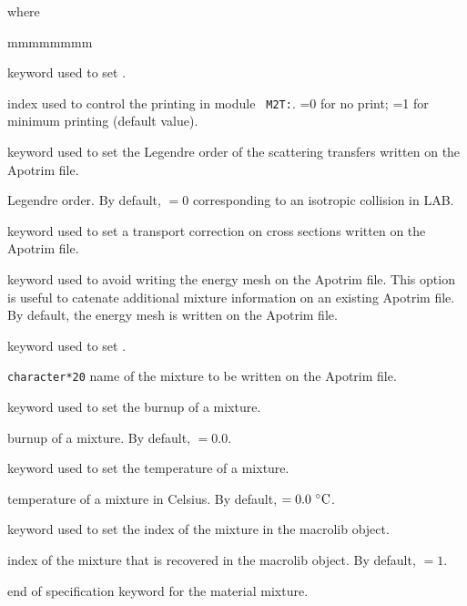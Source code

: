 \noindent where
\begin{ListeDeDescription}{mmmmmmmm}

\item[\moc{EDIT}] keyword used to set .

\item[\dusa{iprint}] index used to control the printing in module {\tt
M2T:}. =0 for no print; =1 for minimum printing (default value).

\item[\moc{PN}] keyword used to set the Legendre order of the scattering transfers written on the Apotrim file.

\item[\dusa{nl}] Legendre order. By default,  $=0$ corresponding to an isotropic collision in LAB.

\item[\moc{TRAN}] keyword used to set a transport correction on cross sections written on the Apotrim file.

\item[\moc{NOMA}] keyword used to avoid writing the energy mesh on the Apotrim file. This
option is useful to catenate additional mixture information on an existing Apotrim file. By
default, the energy mesh is written on the Apotrim file.

\item[\moc{MIX}] keyword used to set .

\item[\dusa{hmix}] {\tt character*20} name of the mixture to be written on the Apotrim file.

\item[\moc{BURN}] keyword used to set the burnup of a mixture.

\item[\dusa{bup}] burnup of a mixture. By default,  $=0.0$.

\item[\moc{TEMP}] keyword used to set the temperature of a mixture.

\item[\dusa{tval}] temperature of a mixture in Celsius. By default,  $=0.0 \ ^\circ{\rm C}$.

\item[\moc{FROM}] keyword used to set the index of the mixture in the {\sc macrolib} object.

\item[\dusa{imixold}] index of the mixture that is recovered in the {\sc macrolib} object. By default, $=1$.

\item[\moc{ENDMIX}] end of specification keyword for the material mixture.

\end{ListeDeDescription}

